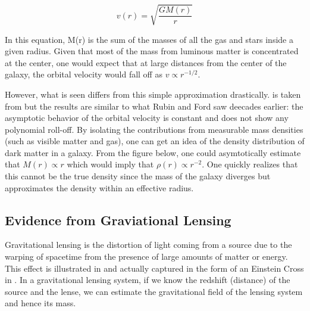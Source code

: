 \begin{equation}
v(r) = \sqrt{\frac{G M(r)}{r}}
\end{equation}	

In this equation, M(r) is the sum of the masses of all the gas and stars inside a given radius.  Given that most of the mass from luminous matter is concentrated at the center, one would expect that at large distances from the center of the galaxy, the orbital velocity would fall off as $v \propto r^{-1/2}$.

However, what is seen differs from this simple approximation drastically.   is taken from  but the results are similar to what Rubin and Ford saw deecades earlier: the asymptotic behavior of the orbital velocity is constant and does not show any polynomial roll-off.  By isolating the contributions from measurable mass densities (such as visible matter and gas), one can get an idea of the density distribution of dark matter in a galaxy.  From the figure below, one could asymtotically estimate that $M(r) \propto r$ which would imply that $\rho(r) \propto r^{-2}$.  One quickly realizes that this cannot be the true density since the mass of the galaxy diverges but approximates the density within an effective radius.



\subsection{Evidence from Graviational Lensing}	

Gravitational lensing is the distortion of light coming from a source due to the warping of spacetime from the presence of large amounts of matter or energy.  This effect is illustrated in  and actually captured in the form of an Einstein Cross in .  In a gravitational lensing system, if we know the redshift (distance) of the source and the lense, we can estimate the gravitational field of the lensing system and hence its mass.


